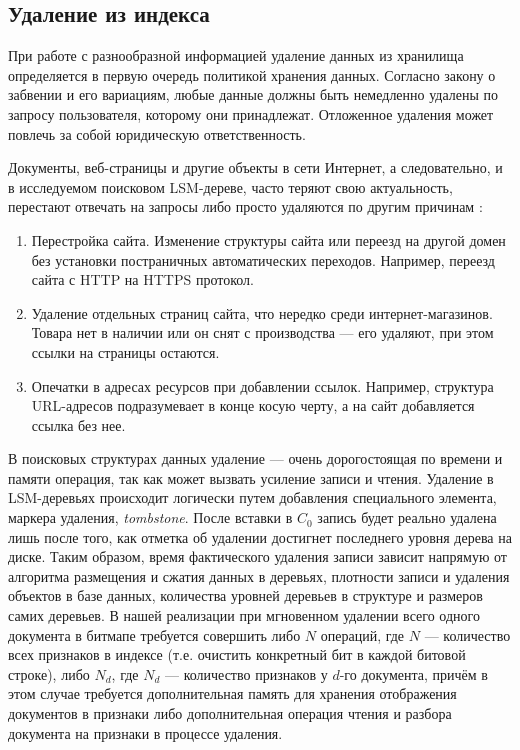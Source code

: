 \subsection{Удаление из индекса}

При работе с разнообразной информацией удаление данных из хранилища определяется
в первую очередь политикой хранения данных. Согласно закону о забвении и его
вариациям, любые данные должны быть немедленно удалены по запросу пользователя,
которому они принадлежат. Отложенное удаления может повлечь за собой юридическую
ответственность.

Документы, веб-страницы и другие объекты в сети Интернет, а следовательно, и в
исследуемом поисковом LSM-дереве, часто теряют свою актуальность, перестают
отвечать на запросы либо просто удаляются по другим причинам \cite{Dangling:2018}:
\begin{enumerate}
    \item Перестройка сайта. Изменение структуры сайта или переезд на другой
    домен без установки постраничных автоматических переходов. Например,
    переезд сайта с HTTP на HTTPS протокол.
    \item Удаление отдельных страниц сайта, что нередко среди интернет-магазинов.
    Товара нет в наличии или он снят с производства — его удаляют, при этом 
    ссылки на страницы остаются.
    \item Опечатки в адресах ресурсов при добавлении ссылок. Например, структура
    URL-адресов подразумевает в конце косую черту, а на сайт добавляется ссылка
    без нее.
\end{enumerate}

В поисковых структурах данных удаление — очень дорогостоящая по времени и
памяти операция, так как может вызвать усиление записи и чтения. Удаление в
LSM-деревьях происходит логически путем добавления специального элемента, маркера 
удаления, \textit{tombstone}. После вставки в $C_0$ запись будет реально удалена
лишь после того, как отметка об удалении достигнет последнего уровня дерева на
диске. Таким образом, время фактического удаления записи зависит напрямую от
алгоритма размещения и сжатия данных в деревьях, плотности записи и удаления
объектов в базе данных, количества уровней деревьев в структуре и размеров самих
деревьев. В нашей реализации при мгновенном удалении всего одного документа в
битмапе требуется совершить либо $N$ операций, где $N$ — количество всех признаков
в индексе (т.е. очистить конкретный бит в каждой битовой строке), либо $N_d$,
где $N_d$ — количество признаков у $d$-го документа, причём в этом случае требуется
дополнительная память для хранения отображения документов в признаки либо 
дополнительная операция чтения и разбора документа на признаки в процессе удаления.


